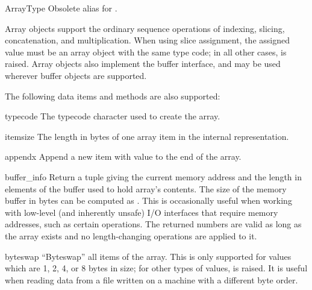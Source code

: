\begin{datadesc}{ArrayType}
Obsolete alias for .
\end{datadesc}


Array objects support the ordinary sequence operations of
indexing, slicing, concatenation, and multiplication.  When using
slice assignment, the assigned value must be an array object with the
same type code; in all other cases,  is raised.
Array objects also implement the buffer interface, and may be used
wherever buffer objects are supported.

The following data items and methods are also supported:

\begin{memberdesc}[array]{typecode}
The typecode character used to create the array.
\end{memberdesc}

\begin{memberdesc}[array]{itemsize}
The length in bytes of one array item in the internal representation.
\end{memberdesc}


\begin{methoddesc}[array]{append}{x}
Append a new item with value  to the end of the array.
\end{methoddesc}

\begin{methoddesc}[array]{buffer_info}{}
Return a tuple  giving the current
memory address and the length in elements of the buffer used to hold
array's contents.  The size of the memory buffer in bytes can be
computed as .  This is occasionally useful when working with
low-level (and inherently unsafe) I/O interfaces that require memory
addresses, such as certain  operations.  The
returned numbers are valid as long as the array exists and no
length-changing operations are applied to it.

\end{methoddesc}

\begin{methoddesc}[array]{byteswap}{}
``Byteswap'' all items of the array.  This is only supported for
values which are 1, 2, 4, or 8 bytes in size; for other types of
values,  is raised.  It is useful when reading
data from a file written on a machine with a different byte order.
\end{methoddesc}

